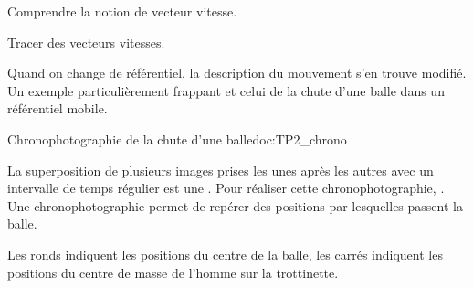 \teteSndMouv

\nomPrenomClasse




\begin{objectifs}
  \item Comprendre la notion de vecteur vitesse.
  \item Tracer des vecteurs vitesses.
\end{objectifs}

\begin{contexte}
  Quand on change de référentiel, la description du mouvement s'en trouve modifié.
  Un exemple particulièrement frappant et celui de la chute d'une balle dans un référentiel mobile.
\end{contexte}





\begin{doc}{Chronophotographie de la chute d'une balle}{doc:TP2_chrono}
  \begin{center}
  \end{center}
  La superposition de plusieurs images prises les unes après les autres avec un intervalle de temps régulier est une .
  Pour réaliser cette chronophotographie, .
  Une chronophotographie permet de repérer des positions par lesquelles passent la balle.
  
  Les ronds indiquent les positions du centre de la balle, les carrés indiquent les positions du centre de masse de l'homme sur la trottinette.
\end{doc}

